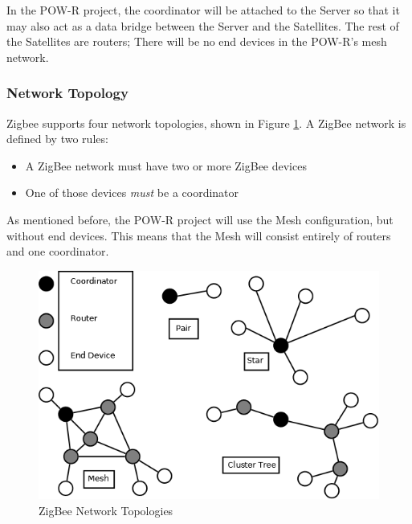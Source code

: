 In the POW-R project, the coordinator will be attached to the Server so that it may
also act as a data bridge between the Server and the Satellites. The rest of the 
Satellites are routers; There will be no end devices in the POW-R's mesh network.


\subsubsection{Network Topology}
Zigbee supports four network topologies, shown in Figure \ref{NetTopo}. A ZigBee network
is defined by two rules:

\begin{itemize}
	\item A ZigBee network must have two or more ZigBee devices
	\item One of those devices \emph{must} be a coordinator
\end{itemize}

As mentioned before, the POW-R project will use the Mesh configuration, but without end 
devices. This means that the Mesh will consist entirely of routers and one coordinator.

\begin{figure}
\centering
\includegraphics[scale=0.3]{Hardware/images/ZigBeeNetworkTypes.png}
\caption{ZigBee Network Topologies}
\label{NetTopo}
\end{figure}